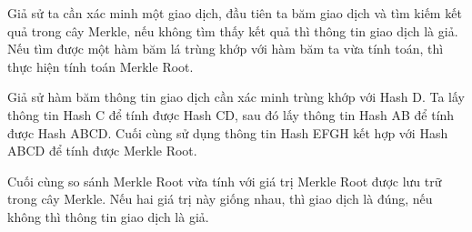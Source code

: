 Giả sử ta cần xác minh một giao dịch, đầu tiên ta băm giao dịch và tìm kiếm kết quả
trong cây Merkle, nếu không tìm thấy kết quả thì thông tin giao dịch là giả. Nếu tìm được
một hàm băm lá trùng khớp với hàm băm ta vừa tính toán, thì thực hiện tính toán Merkle Root. 

Giả sử hàm băm thông tin giao dịch cần xác minh trùng khớp với Hash D.
Ta lấy thông tin Hash C để tính được Hash CD, sau đó lấy thông tin Hash AB để tính được Hash ABCD.
Cuối cùng sử dụng thông tin Hash EFGH kết hợp với Hash ABCD để tính được Merkle Root.

Cuối cùng so sánh Merkle Root vừa tính với giá trị Merkle Root được lưu trữ trong 
cây Merkle. Nếu hai giá trị này giống nhau, thì giao dịch là đúng, nếu không thì thông tin
giao dịch là giả.

